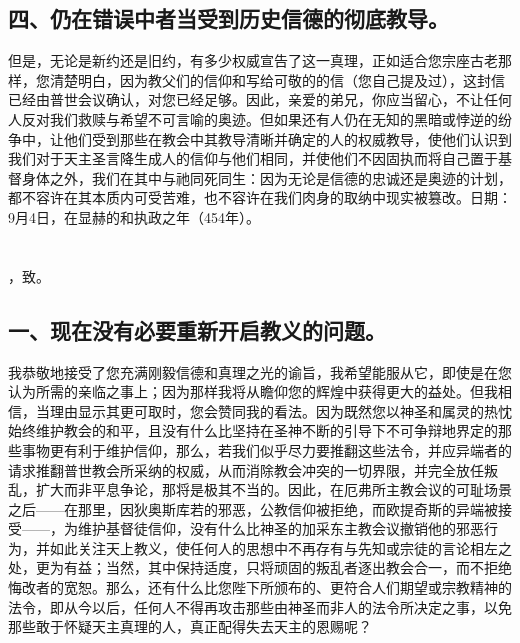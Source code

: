 \subsection{四、仍在错误中者当受到历史信德的彻底教导。}

但是，无论是新约还是旧约，有多少权威宣告了这一真理，正如适合您宗座古老那样，您清楚明白，因为教父们的信仰和写给可敬的的信（您自己提及过），这封信已经由普世会议确认，对您已经足够。因此，亲爱的弟兄，你应当留心，不让任何人反对我们救赎与希望不可言喻的奥迹。但如果还有人仍在无知的黑暗或悖逆的纷争中，让他们受到那些在教会中其教导清晰并确定的人的权威教导，使他们认识到我们对于天主圣言降生成人的信仰与他们相同，并使他们不因固执而将自己置于基督身体之外，我们在其中与祂同死同生：因为无论是信德的忠诚还是奥迹的计划，都不容许在其本质内可受苦难，也不容许在我们肉身的取纳中现实被篡改。日期：9月4日，在显赫的和执政之年（454年）。\par



\section{}

，致。\par


\subsection{一、现在没有必要重新开启教义的问题。}

我恭敬地接受了您充满刚毅信德和真理之光的谕旨，我希望能服从它，即使是在您认为所需的亲临之事上；因为那样我将从瞻仰您的辉煌中获得更大的益处。但我相信，当理由显示其更可取时，您会赞同我的看法。因为既然您以神圣和属灵的热忱始终维护教会的和平，且没有什么比坚持在圣神不断的引导下不可争辩地界定的那些事物更有利于维护信仰，那么，若我们似乎尽力要推翻这些法令，并应异端者的请求推翻普世教会所采纳的权威，从而消除教会冲突的一切界限，并完全放任叛乱，扩大而非平息争论，那将是极其不当的。因此，在厄弗所主教会议的可耻场景之后——在那里，因狄奥斯库若的邪恶，公教信仰被拒绝，而欧提奇斯的异端被接受——，为维护基督徒信仰，没有什么比神圣的加采东主教会议撤销他的邪恶行为，并如此关注天上教义，使任何人的思想中不再存有与先知或宗徒的言论相左之处，更为有益；当然，其中保持适度，只将顽固的叛乱者逐出教会合一，而不拒绝悔改者的宽恕。那么，还有什么比您陛下所颁布的、更符合人们期望或宗教精神的法令，即从今以后，任何人不得再攻击那些由神圣而非人的法令所决定之事，以免那些敢于怀疑天主真理的人，真正配得失去天主的恩赐呢？\par

